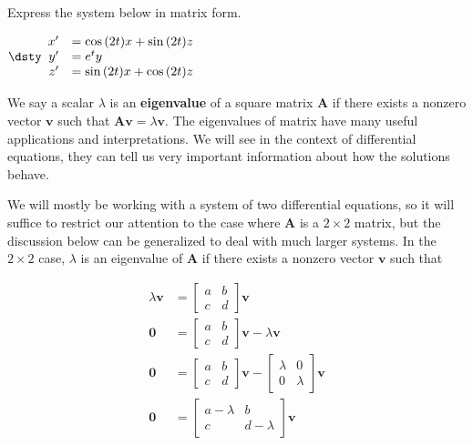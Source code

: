 \ii Express the system below in matrix form.\label{13problem11}

$\dsty \begin{array}{rl}
x' &= \cos{(2t)}x + \sin{(2t)}z\\
y' &= e^ty \\
z' &= \sin{(2t)}x + \cos{(2t)}z
\end{array}$ \vfill
\ee



We say a scalar $\lambda$ is an \textbf{eigenvalue} of a square matrix $\mathbf{A}$ if there exists a nonzero vector $\mathbf{v}$ such that $\mathbf{Av} = \lambda \mathbf{v}$. The eigenvalues of matrix have many useful applications and interpretations. We will see in the context of differential equations, they can tell us very important information about how the solutions behave.

We will mostly be working with a system of two differential equations, so it will suffice to restrict our attention to the case where $\mathbf{A}$ is a $2 \times 2$ matrix, but the discussion below can be generalized to deal with much larger systems. In the $2 \times 2$ case, $\lambda$ is an eigenvalue of $\mathbf{A}$ if there exists a nonzero vector $\mathbf{v}$ such that 

\begin{align*}
\lambda \mathbf{v} &= \left[ \begin{array}{cc} a & b  \\ c & d \end{array} \right]  \mathbf{v} \\
 \textbf{0} &= \left[ \begin{array}{cc} a & b  \\ c & d \end{array} \right]  \mathbf{v} - \lambda \mathbf{v} \\
 \textbf{0} &= \left[ \begin{array}{cc} a & b  \\ c & d \end{array} \right]  \mathbf{v} - \left[ \begin{array}{cc} \lambda & 0  \\ 0 & \lambda \end{array} \right]  \mathbf{v} \\
 \textbf{0} &= \left[ \begin{array}{cc} a-\lambda & b  \\ c & d-\lambda \end{array} \right] \mathbf{v} 
 \end{align*}
 
